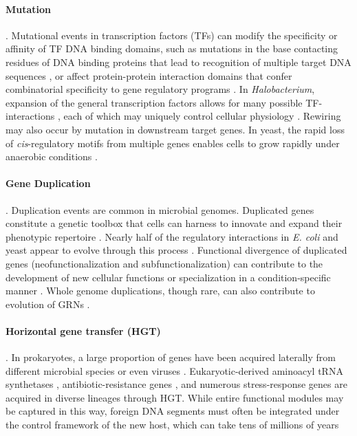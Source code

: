 \paragraph{Mutation}. Mutational events in transcription factors (TFs) can modify the specificity or affinity of TF DNA binding domains, such as mutations in the base contacting residues of DNA binding proteins that lead to recognition of multiple target DNA sequences \cite{luscombe_protein-dna_2002}, or affect protein-protein interaction domains that confer combinatorial specificity to gene regulatory programs \cite{baliga_is_2000}. In \textit{Halobacterium}, expansion of the general transcription factors allows for many possible TF-interactions \cite{feller_life_2007}, each of which may uniquely control cellular physiology \cite{facciotti_general_2007}. Rewiring may also occur by mutation in downstream target genes. In yeast, the rapid loss of \textit{cis}-regulatory motifs from multiple genes enables cells to grow rapidly under anaerobic conditions \cite{ihmels_rewiring_2005}.

\paragraph{Gene Duplication}. Duplication events are common in microbial genomes. Duplicated genes constitute a genetic toolbox that cells can harness to innovate and expand their phenotypic repertoire \cite{teichmann_gene_2004,gevers_gene_2004}.  Nearly half of the regulatory interactions in \textit{E. coli} and yeast appear to evolve through this process \cite{teichmann_gene_2004}.  Functional divergence of duplicated genes (neofunctionalization and subfunctionalization) can contribute to the development of new cellular functions  \cite{li_molecular_1997} or specialization in a condition-specific manner \cite{wapinski_gene_2010}. Whole genome duplications, though rare, can also contribute to evolution of GRNs \cite{kellis_methods_2004}. 

\paragraph{Horizontal gene transfer (HGT)}.  In prokaryotes, a large proportion of genes have been acquired laterally from different microbial species \cite{koonin_horizontal_2001} or even viruses \cite{rohwer_viruses_2009}. Eukaryotic-derived aminoacyl tRNA synthetases \cite{woese_aminoacyl-trna_2000}, antibiotic-resistance genes \cite{davies_origins_1996}, and numerous stress-response genes \cite{nelson_evidence_1999} are acquired in diverse lineages through HGT. While entire functional modules may be captured in this way, foreign DNA segments must often be integrated under the control framework of the new host, which can take tens of millions of years \cite{lercher_integration_2008}   







 

 
 